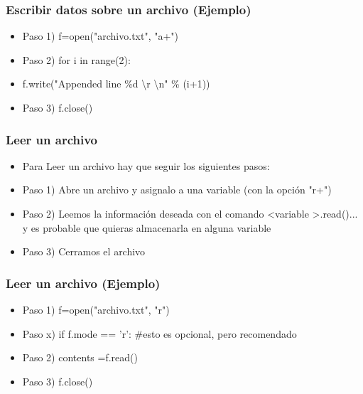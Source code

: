 \documentclass[hyperref={pdfpagelabels=false},xcolor=pst,pdf,fragile]{beamer}
\begin{document}
\begin{frame}
    \frametitle{Escribir datos sobre un archivo (Ejemplo)}
    \pause
    \begin{itemize}
    \item Paso 1) f=open("archivo.txt", "a+")
    \item Paso 2) for i in range(2):
    \item \quad \quad \quad f.write("Appended line \%d \textbackslash r \textbackslash n" \% (i+1))
    \item Paso 3) f.close()
    \end{itemize}
\end{frame}

\begin{frame}
    \frametitle{Leer un archivo}
    \pause
    \begin{itemize}
    \item Para Leer un archivo hay que seguir los siguientes pasos:
    \item Paso 1) Abre un archivo y asignalo a una variable (con la opción "r+")
    \item Paso 2) Leemos la información deseada con el comando \textless variable \textgreater .read()... y es probable que quieras almacenarla en alguna variable
    \item Paso 3) Cerramos el archivo
    \end{itemize}
\end{frame}

\begin{frame}
    \frametitle{Leer un archivo (Ejemplo)}
    \pause
    \begin{itemize}
    \item Paso 1) f=open("archivo.txt", "r")
    \item Paso x) if f.mode == 'r': \#esto es opcional, pero recomendado
    \item Paso 2) contents =f.read()
    \item Paso 3) f.close()
    \end{itemize}
\end{frame}
\end{document}
